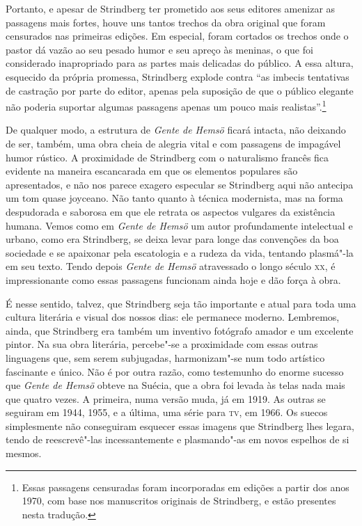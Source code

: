 Portanto, e apesar de Strindberg ter prometido aos seus editores 
amenizar as passagens mais fortes, houve uns tantos trechos da obra
original que foram censurados nas primeiras edições. Em especial, foram
cortados os trechos onde o pastor dá vazão ao seu pesado humor e seu 
apreço às meninas, o que foi considerado inapropriado para as partes 
mais delicadas do público. A essa altura, esquecido da própria promessa, 
Strindberg explode contra ``as imbecis tentativas de castração por parte 
do editor, apenas pela suposição de que o público elegante não poderia
suportar algumas passagens apenas um pouco mais realistas''.\footnote{ Essas passagens
censuradas foram incorporadas em edições a partir dos anos 1970, com base 
nos manuscritos originais de Strindberg, e estão presentes nesta tradução.}

De qualquer modo, a estrutura de \textit{Gente de Hemsö} ficará intacta, não
deixando de ser, também, uma obra cheia de alegria vital e com
passagens de impagável humor rústico. A proximidade de Strindberg com o naturalismo
francês fica evidente na maneira escancarada em que os elementos
populares são apresentados, e não nos parece exagero
especular se Strindberg aqui não antecipa um tom quase joyceano. 
Não tanto quanto à técnica modernista, mas na forma despudorada e saborosa em
que ele retrata os aspectos vulgares da existência humana.
Vemos como em \textit{Gente de Hemsö} um autor profundamente intelectual 
e urbano, como era Strindberg, se deixa levar para longe das convenções 
da boa sociedade e se apaixonar pela escatologia e a rudeza da vida,
tentando plasmá"-la em seu texto. Tendo depois \textit{Gente de Hemsö} 
atravessado o longo século \textsc{xx}, é impressionante como essas
passagens funcionam ainda hoje e dão força à obra. 

 É nesse sentido, talvez, que Strindberg seja tão importante e atual		%
para toda uma cultura literária e visual dos nossos dias: ele permanece
moderno. Lembremos, ainda, que Strindberg era também um inventivo fotógrafo amador
e um excelente pintor. Na sua obra literária, percebe"-se a proximidade com 
essas outras linguagens que, sem serem subjugadas, harmonizam"-se num todo
artístico fascinante e único. Não é por outra razão, como testemunho do enorme sucesso
que \textit{Gente de Hemsö} obteve na Suécia, que a obra foi levada às telas nada mais
que quatro vezes.  A primeira, numa versão muda, já em 1919. As outras se
seguiram em 1944, 1955, e a última, uma série para \textsc{tv}, em 1966. 
Os suecos simplesmente não conseguiram esquecer essas imagens que
Strindberg lhes legara, tendo de reescrevê"-las incessantemente e 
plasmando"-as em novos espelhos de si mesmos. 

